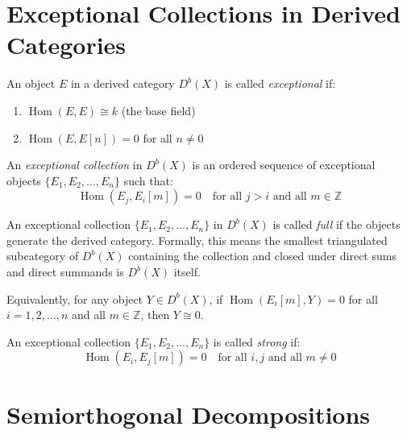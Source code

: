 \documentclass[12pt]{article}
\begin{document}
\section{Exceptional Collections in Derived Categories}

\begin{definition}
    An object $E$ in a derived category $D^b(X)$ is called \textit{exceptional} if:
    \begin{enumerate}
        \item $\operatorname{Hom}(E, E) \cong k$ (the base field)
        \item $\operatorname{Hom}(E, E[n]) = 0$ for all $n \neq 0$
    \end{enumerate}
\end{definition}

\begin{definition}
    An \textit{exceptional collection} in $D^b(X)$ is an ordered sequence of exceptional objects $\{E_1, E_2, \ldots, E_n\}$ such that:
    \[
        \operatorname{Hom}(E_j, E_i[m]) = 0 \quad \text{for all } j > i \text{ and all } m \in \mathbb{Z}
    \]
\end{definition}

\begin{definition}
    An exceptional collection $\{E_1, E_2, \ldots, E_n\}$ in $D^b(X)$ is called \textit{full} if the objects generate the derived category. Formally, this means the smallest triangulated subcategory of $D^b(X)$ containing the collection and closed under direct sums and direct summands is $D^b(X)$ itself.

    Equivalently, for any object $Y \in D^b(X)$, if $\operatorname{Hom}(E_i[m], Y) = 0$ for all $i=1,2,\ldots,n$ and all $m \in \mathbb{Z}$, then $Y \cong 0$.
\end{definition}

\begin{definition}
    An exceptional collection $\{E_1, E_2, \ldots, E_n\}$ is called \textit{strong} if:
    \[
        \operatorname{Hom}(E_i, E_j[m]) = 0 \quad \text{for all } i, j \text{ and all } m \neq 0
    \]
\end{definition}

\section{Semiorthogonal Decompositions}
\end{document}
